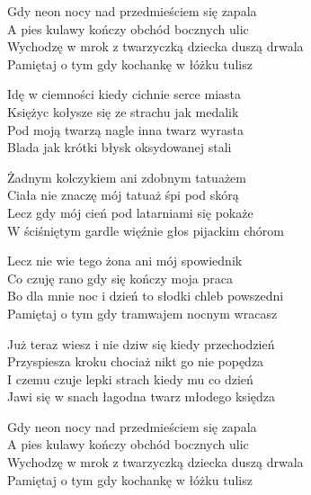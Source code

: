 \begin{text}
    Gdy neon nocy nad przedmieściem się zapala\\
    A pies kulawy kończy obchód bocznych ulic\\
    Wychodzę w mrok z twarzyczką dziecka duszą drwala\\
    Pamiętaj o tym gdy kochankę w łóżku tulisz

    Idę w ciemności kiedy cichnie serce miasta\\
    Księżyc kołysze się ze strachu jak medalik\\
    Pod moją twarzą nagle inna twarz wyrasta\\
    Blada jak krótki błysk oksydowanej stali

    Żadnym kolczykiem ani zdobnym tatuażem\\
    Ciała nie znaczę mój tatuaż śpi pod skórą\\
    Lecz gdy mój cień pod latarniami się pokaże\\
    W ściśniętym gardle więźnie głos pijackim chórom

    Lecz nie wie tego żona ani mój spowiednik\\
    Co czuję rano gdy się kończy moja praca\\
    Bo dla mnie noc i dzień to słodki chleb powszedni\\
    Pamiętaj o tym gdy tramwajem nocnym wracasz

    Już teraz wiesz i nie dziw się kiedy przechodzień\\
    Przyspiesza kroku chociaż nikt go nie popędza\\
    I czemu czuje lepki strach kiedy mu co dzień\\
    Jawi się w snach łagodna twarz młodego księdza

    Gdy neon nocy nad przedmieściem się zapala\\
    A pies kulawy kończy obchód bocznych ulic\\
    Wychodzę w mrok z twarzyczką dziecka duszą drwala\\
    Pamiętaj o tym gdy kochankę w łóżku tulisz
\end{text}
\begin{chord}

\end{chord}